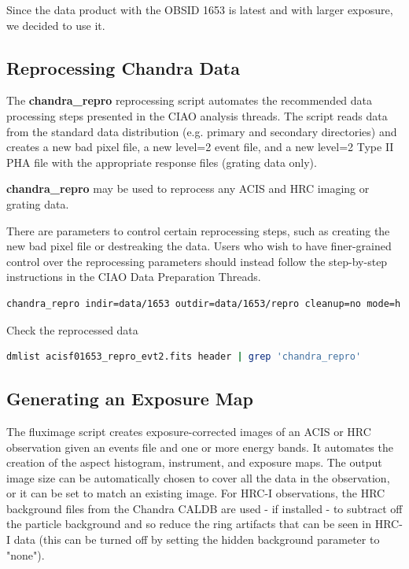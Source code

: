 \documentclass[a4paper,12pt]{article}
\begin{document}
Since the data product with the OBSID 1653 is latest and with larger exposure, we decided to use it.

\subsection{Reprocessing Chandra Data}
The \textbf{chandra\_repro} reprocessing script automates the recommended data processing steps presented in the CIAO analysis threads. The script reads data from the standard data distribution (e.g. primary and secondary directories) and creates a new bad pixel file, a new level=2 event file, and a new level=2 Type II PHA file with the appropriate response files (grating data only).

\textbf{chandra\_repro} may be used to reprocess any ACIS and HRC imaging or grating data.

There are parameters to control certain reprocessing steps, such as creating the new bad pixel file or destreaking the data. Users who wish to have finer-grained control over the reprocessing parameters should instead follow the step-by-step instructions in the CIAO Data Preparation Threads.

\begin{lstlisting}[language=bash]
chandra_repro indir=data/1653 outdir=data/1653/repro cleanup=no mode=h verbose=1
\end{lstlisting}

Check the reprocessed data
\begin{lstlisting}[language=bash]
    dmlist acisf01653_repro_evt2.fits header | grep 'chandra_repro'
\end{lstlisting}


\subsection{Generating an Exposure Map}
The fluximage script creates exposure-corrected images of an ACIS or HRC observation given an events file and one or more energy bands. It automates the creation of the aspect histogram, instrument, and exposure maps. The output image size can be automatically chosen to cover all the data in the observation, or it can be set to match an existing image. For HRC-I observations, the HRC background files from the Chandra CALDB are used - if installed - to subtract off the particle background and so reduce the ring artifacts that can be seen in HRC-I data (this can be turned off by setting the hidden background parameter to "none").
\end{document}
